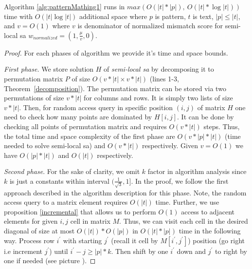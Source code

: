 \begin{theorem}
Algorithm \ref{alg:patternMathing1} runs in $max(O(|t|*|p|),\ O(|t| * \log |t|))$ time with $O( |t| \log |t|)$ additional space where $p$ is pattern, $t$ is text, $|p| \leq |t|$, and $v=O(1)$ where $v$ is denominator of normalized mismatch score for semi-local sa $w_{normalized} = (1,\frac{\mu}{v},0)$.
\end{theorem}
\begin{proof}
  For each phases of algorithm we provide it's time and space bounds.
  
\emph{First phase.}
We store solution $H$ of \emph{semi-local sa} by decomposing it to permutation matrix $P$ of size $O(v*|t| \times v*|t|)$ (lines 1-3, Theorem~\ref{decomposition}).
The permutation matrix can be stored via two permutations of size $v*|t|$ for columns and rows.
It is simply two lists of size $v*|t|$.
Then, for random access query in specific position $(i,j)$ of matrix $H$ one need to check how many points are dominated by $H [i,j]$.
It can be done by checking all points of permutation matrix and requires $O(v * |t|)$ steps.
Thus, the total time and space complexity of the first phase are $O(v *|p| * |t|)$ (time needed to solve semi-local sa) and $O(v*|t|)$ respectively.
Given $v=O(1)$ we have $O(|p| * |t|)$ and $O(|t|)$ respectively.



\emph{Second phase}.
For the sake of clarity, we omit $k$ factor in algorithm analysis since $k$ is just a constants within interval $(\frac{1}{\sqrt{3}},1]$.
In the proof, we follow the first approach described in the algorithm description for this phase.
Note, the random access query to a matrix element requires $O(|t|)$ time.
Further, we use  proposition \ref{incremental} that allows us to perform $O(1)$ access to adjacent elements for given $i,j$ cell in matrix $M$.
Thus, we can visit each cell in the desired diagonal of size at most $O(|t|) * O(|p|) $ in $O(|t|*|p|)$ time in the following way.
Process row $i^{'}$ with starting $j^{'}$ (recall it cell by $M[i^{'},j^{'}]$) position  (go right i.e increment $j^{'}$) until $i^{'}-j \geq |p|*k$.
Then shift by one $i^{'}$ down and $j^{'}$ to right by one if needed (see picture ).


\end{proof}
